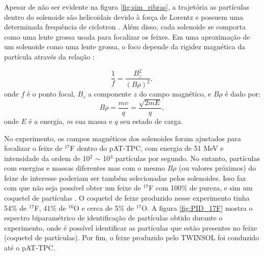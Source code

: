 \documentclass[a4paper,12pt,oneside]{book}
\begin{document}
\par Apesar de não ser evidente na figura \ref{fig:sim_ribras}, a trajetória as partículas dentro do solenoide são helicoidais devido à força de Lorentz e possuem uma determinada frequência de ciclotron \cite{ribras_leo}. Além disso, cada solenoide se comporta como uma lente grossa usada para focalizar os feixes. Em uma aproximação de um solenoide como uma lente grossa, o foco depende da rigidez magnética da partícula através da relação \cite{KOLATA1989503, zamora_mater}:

\begin{equation}
    \frac{1}{f} = \frac{B_z ^2}{(B\rho)^2},
\end{equation}
%
onde $f$ é o ponto focal, $B_z$ a componente $z$ do campo magnético, e $B\rho$ é dado por:
%
\begin{equation}
    B\rho = \frac{mv}{q} = \frac{\sqrt{2mE}}{q},
\end{equation}
%
onde $E$ é a energia, $m$ sua massa e $q$ seu estado de carga.


\par No experimento, os campos magnéticos dos solenoides foram ajustados para focalizar o feixe de $^{17}$F dentro do pAT-TPC, com energia de 51 MeV e intensidade da ordem de 10$^2$ $\sim$ 10$^3$ partículas por segundo. No entanto, partículas com energias e massas diferentes mas com o mesmo $B\rho$ (ou valores próximos) do feixe de interesse poderiam ser também selecionadas pelos solenoides. Isso faz com que não seja possível obter um feixe de $^{17}$F com 100\% de pureza, e sim um coquetel de partículas \cite{zamora_mater}. O coquetel de feixe produzido nesse experimento tinha 54\% de $^{17}$F, 41\% de $^{16}$O e cerca de 5\% de $^{17}$O. A figura \ref{fig:PID_17F} mostra o espectro biparamétrico de identificação de partículas obtido durante o experimento, onde é possível identificar as partículas que estão presentes no feixe (coquetel de partículas). Por fim, o feixe produzido pelo TWINSOL foi conduzido até o pAT-TPC.
\end{document}
